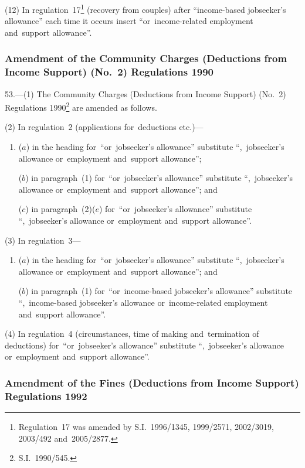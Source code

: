 \documentclass[12pt,a4paper]{article}
\begin{document}
(12) In regulation~17\footnote{Regulation~17 was amended by S.I.~1996/1345, 1999/2571, 2002/3019, 2003/492 and~2005/2877.} (recovery from couples) after “income-based jobseeker’s allowance” each time it occurs insert “or~income-related employment and~support allowance”.

\subsubsection[53. Amendment of the Community Charges (Deductions from Income Support) (No.~2) Regulations 1990]{Amendment of the Community Charges (Deductions from Income Support) (No.~2) Regulations 1990}

53.---(1)  The Community Charges (Deductions from Income Support) (No.~2) Regulations 1990\footnote{S.I.~1990/545.} are amended as follows.

(2) In regulation~2 (applications for~deductions etc.)—
\begin{enumerate}\item[]
($a$) in the heading for~“or~jobseeker’s allowance” substitute “,~jobseeker’s allowance or~employment and~support allowance”;

($b$) in paragraph~(1) for~“or~jobseeker’s allowance” substitute “,~jobseeker’s allowance or~employment and~support allowance”; and

($c$) in paragraph~(2)($e$)  for~“or~jobseeker’s allowance” substitute “,~jobseeker’s allowance or~employment and~support allowance”.
\end{enumerate}

(3) In regulation~3—
\begin{enumerate}\item[]
($a$) in the heading for~“or~jobseeker’s allowance” substitute “,~jobseeker’s allowance or~employment and~support allowance”; and

($b$) in paragraph~(1) for~“or~income-based jobseeker’s allowance” substitute “,~income-based jobseeker’s allowance or~income-related employment and~support allowance”.
\end{enumerate}

(4) In regulation~4 (circumstances, time of making and~termination of deductions) for~“or~jobseeker’s allowance” substitute “,~jobseeker’s allowance or~employment and~support allowance”.

\subsubsection[54. Amendment of the Fines (Deductions from Income Support) Regulations 1992]{Amendment of the Fines (Deductions from Income Support) Regulations 1992}
\end{document}

